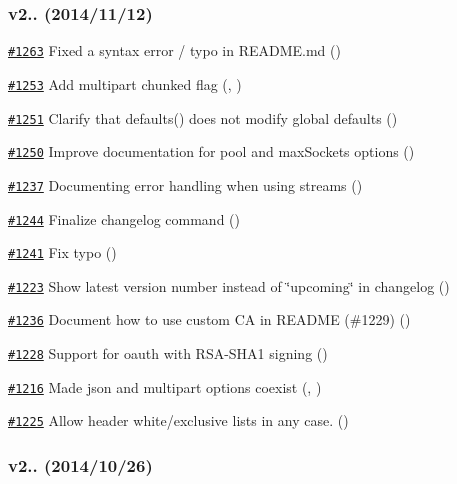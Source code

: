 \subsubsection*{v2.. (2014/11/12)}


\begin{DoxyItemize}
\item \href{https://github.com/request/request/pull/1263}{\tt \#1263} Fixed a syntax error / typo in R\+E\+A\+D\+M\+E.\+md ()
\item \href{https://github.com/request/request/pull/1253}{\tt \#1253} Add multipart chunked flag (, )
\item \href{https://github.com/request/request/pull/1251}{\tt \#1251} Clarify that defaults() does not modify global defaults ()
\item \href{https://github.com/request/request/pull/1250}{\tt \#1250} Improve documentation for pool and max\+Sockets options ()
\item \href{https://github.com/request/request/pull/1237}{\tt \#1237} Documenting error handling when using streams ()
\item \href{https://github.com/request/request/pull/1244}{\tt \#1244} Finalize changelog command ()
\item \href{https://github.com/request/request/pull/1241}{\tt \#1241} Fix typo ()
\item \href{https://github.com/request/request/pull/1223}{\tt \#1223} Show latest version number instead of \char`\"{}upcoming\char`\"{} in changelog ()
\item \href{https://github.com/request/request/pull/1236}{\tt \#1236} Document how to use custom CA in R\+E\+A\+D\+ME (\#1229) ()
\item \href{https://github.com/request/request/pull/1228}{\tt \#1228} Support for oauth with R\+S\+A-\/\+S\+H\+A1 signing ()
\item \href{https://github.com/request/request/pull/1216}{\tt \#1216} Made json and multipart options coexist (, )
\item \href{https://github.com/request/request/pull/1225}{\tt \#1225} Allow header white/exclusive lists in any case. ()
\end{DoxyItemize}

\subsubsection*{v2.. (2014/10/26)}


